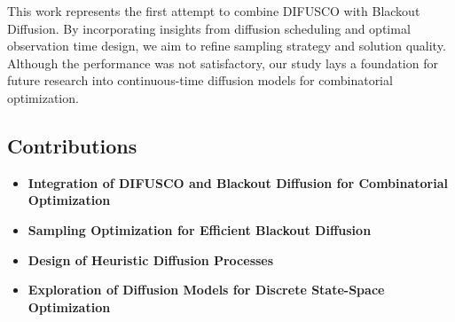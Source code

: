 This work represents the first attempt to combine DIFUSCO with Blackout Diffusion. By incorporating insights from diffusion scheduling and optimal observation time design, we aim to refine sampling strategy and solution quality. Although the performance was not satisfactory, our study lays a foundation for future research into continuous-time diffusion models for combinatorial optimization.

\subsection*{Contributions}

\begin{itemize} \item \textbf{Integration of DIFUSCO and Blackout Diffusion for Combinatorial Optimization}
\item \textbf{Sampling Optimization for Efficient Blackout Diffusion}
\item \textbf{Design of Heuristic Diffusion Processes}
\item \textbf{Exploration of Diffusion Models for Discrete State-Space Optimization}
\end{itemize}